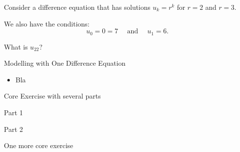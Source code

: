 \bookonlynewpage


\question
	Consider a difference equation that has solutions $u_k = r^k$ for $r=2$ and $r=3$.
	
	We also have the conditions:
	$$ 
	u_0 = 0 = 7 \quad \text{ and } \quad u_1=6.
	$$
	
	What is $u_{22}$?




%
%



\begin{module}{Modelling with One Difference Equation}
	\label{diff:model}

	
	
\end{module}



\begin{lesson}

	\begin{itemize}
		\item Bla
	\end{itemize}
	

\end{lesson}


\newpage

\question
	Core Exercise with several parts
\begin{parts}
	\item Part 1
	\item Part 2
\end{parts}

\bookonlynewpage


\question
	One more core exercise


%
%
%
%
%
%
%
%	
%	
%
%
%
%
%	
%
%
%
%
%
%
%
%
%





